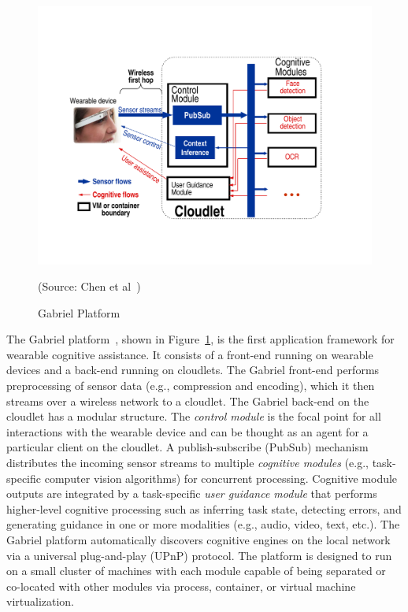 \begin{figure}
\centering
\includegraphics[width=0.8\linewidth]{FIGS/fig-backend-structure-simple-crop.pdf}
\begin{captiontext}
{\rm (Source: Chen et al~\cite{chen2017empirical})}
\end{captiontext}
\caption{Gabriel Platform}
\label{fig:gabriel}
\end{figure}

The Gabriel platform~\cite{ha2014towards,chen2017empirical}, shown in
Figure~\ref{fig:gabriel}, is the first application framework for wearable
cognitive assistance. It consists of a front-end running on wearable devices and
a back-end running on cloudlets. The Gabriel front-end performs preprocessing of
sensor data (e.g., compression and encoding), which it then streams over a
wireless network to a cloudlet.  The Gabriel back-end on the cloudlet has a
modular structure. The {\em control module} is the focal point for all
interactions with the wearable device and can be thought as an agent for a
particular client on the cloudlet. A publish-subscribe (PubSub) mechanism
distributes the incoming sensor streams to multiple {\em cognitive modules}
(e.g., task-specific computer vision algorithms) for concurrent processing.
Cognitive module outputs are integrated by a task-specific {\em user guidance
module} that performs higher-level cognitive processing such as inferring task
state, detecting errors, and generating guidance in one or more modalities
(e.g., audio, video, text, etc.). The Gabriel platform automatically discovers
cognitive engines on the local network via a universal plug-and-play (UPnP)
protocol. The platform is designed to run on a small cluster of machines with
each module capable of being separated or co-located with other modules via
process, container, or virtual machine virtualization. 


